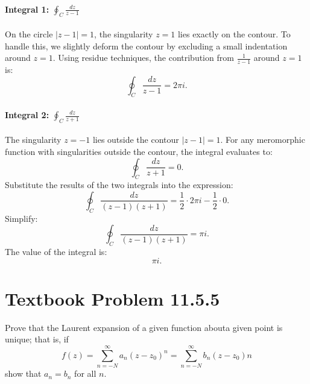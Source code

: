 \documentclass[12pt]{article}
\begin{document}
        \paragraph{Integral 1: \(\oint_C \frac{dz}{z - 1}\)} On the circle \(|z - 1| = 1\), the singularity \(z = 1\) lies exactly on the contour. To handle this, we slightly deform the contour by excluding a small indentation around \(z = 1\). Using residue techniques, the contribution from \(\frac{1}{z - 1}\) around \(z = 1\) is:
        \[
        \oint_C \frac{dz}{z - 1} = 2\pi i.
        \]
        \paragraph{Integral 2: \(\oint_C \frac{dz}{z + 1}\)} The singularity \(z = -1\) lies outside the contour \(|z - 1| = 1\). For any meromorphic function with singularities outside the contour, the integral evaluates to:
        \[
        \oint_C \frac{dz}{z + 1} = 0.
        \]
        Substitute the results of the two integrals into the expression:
        \[
        \oint_C \frac{dz}{(z - 1)(z + 1)} = \frac{1}{2} \cdot 2\pi i - \frac{1}{2} \cdot 0.
        \]
        Simplify:
        \[
        \oint_C \frac{dz}{(z - 1)(z + 1)} = \pi i.
        \]
        The value of the integral is:
        \[
        \boxed{\pi i}.
        \]

\section*{Textbook Problem 11.5.5}
    Prove that the Laurent expansion of a given function abouta given point is unique; that is, if 
    \[
        f(z) = \sum_{n=-N}^\infty a_n(z - z_0)^n = \sum_{n=-N}^\infty b_n(z-z_0)n
    \]
    show that $a_n = b_n$ for all $n$.
\end{document}
